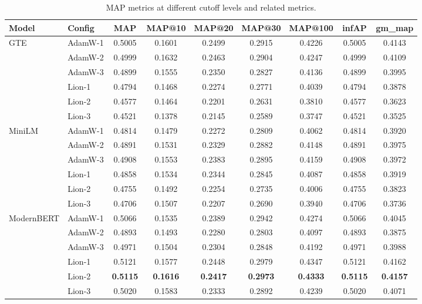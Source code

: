 \documentclass[conference]{IEEEtran}
\begin{document}
\begin{table}[t]
\centering
\caption{MAP metrics at different cutoff levels and related metrics.}
\label{tab:map_metrics}
\small
\begin{tabular}{llccccccc}
\toprule
\textbf{Model} & \textbf{Config} & \textbf{MAP} & \textbf{MAP@10} & \textbf{MAP@20} & \textbf{MAP@30} & \textbf{MAP@100} & \textbf{infAP} & \textbf{gm\_map} \\
\midrule
\multirow{6}{*}{GTE} & AdamW-1 & 0.5005 & 0.1601 & 0.2499 & 0.2915 & 0.4226 & 0.5005 & 0.4143 \\
 & AdamW-2 & 0.4999 & 0.1632 & 0.2463 & 0.2904 & 0.4247 & 0.4999 & 0.4109 \\
 & AdamW-3 & 0.4899 & 0.1555 & 0.2350 & 0.2827 & 0.4136 & 0.4899 & 0.3995 \\
 & Lion-1 & 0.4794 & 0.1468 & 0.2274 & 0.2771 & 0.4039 & 0.4794 & 0.3878 \\
 & Lion-2 & 0.4577 & 0.1464 & 0.2201 & 0.2631 & 0.3810 & 0.4577 & 0.3623 \\
 & Lion-3 & 0.4521 & 0.1378 & 0.2145 & 0.2589 & 0.3747 & 0.4521 & 0.3525 \\
\midrule
\multirow{6}{*}{MiniLM} & AdamW-1 & 0.4814 & 0.1479 & 0.2272 & 0.2809 & 0.4062 & 0.4814 & 0.3920 \\
 & AdamW-2 & 0.4891 & 0.1531 & 0.2329 & 0.2882 & 0.4148 & 0.4891 & 0.3975 \\
 & AdamW-3 & 0.4908 & 0.1553 & 0.2383 & 0.2895 & 0.4159 & 0.4908 & 0.3972 \\
 & Lion-1 & 0.4858 & 0.1534 & 0.2344 & 0.2845 & 0.4087 & 0.4858 & 0.3919 \\
 & Lion-2 & 0.4755 & 0.1492 & 0.2254 & 0.2735 & 0.4006 & 0.4755 & 0.3823 \\
 & Lion-3 & 0.4706 & 0.1507 & 0.2207 & 0.2690 & 0.3940 & 0.4706 & 0.3736 \\
\midrule
\multirow{6}{*}{ModernBERT} & AdamW-1 & 0.5066 & 0.1535 & 0.2389 & 0.2942 & 0.4274 & 0.5066 & 0.4045 \\
 & AdamW-2 & 0.4893 & 0.1493 & 0.2280 & 0.2803 & 0.4097 & 0.4893 & 0.3875 \\
 & AdamW-3 & 0.4971 & 0.1504 & 0.2304 & 0.2848 & 0.4192 & 0.4971 & 0.3988 \\
 & Lion-1 & 0.5121 & 0.1577 & 0.2448 & 0.2979 & 0.4347 & 0.5121 & 0.4162 \\
 & Lion-2 & \textbf{0.5115} & \textbf{0.1616} & \textbf{0.2417} & \textbf{0.2973} & \textbf{0.4333} & \textbf{0.5115} & \textbf{0.4157} \\
 & Lion-3 & 0.5020 & 0.1583 & 0.2333 & 0.2892 & 0.4239 & 0.5020 & 0.4071 \\
\bottomrule
\end{tabular}
\end{table}
\end{document}
